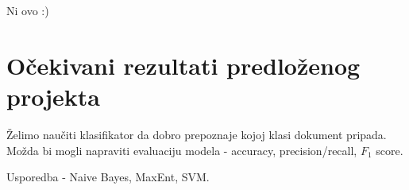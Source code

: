 \documentclass[12pt,a4paper,titlepage]{article}
\begin{document}
Ni ovo :)

\section{Očekivani rezultati predloženog projekta}

Želimo naučiti klasifikator da dobro prepoznaje kojoj klasi dokument pripada. Možda bi mogli napraviti evaluaciju modela - accuracy, precision/recall, $F_1$ score.

Usporedba - Naive Bayes, MaxEnt, SVM.

\newpage

\nocite{*}



\end{document}
